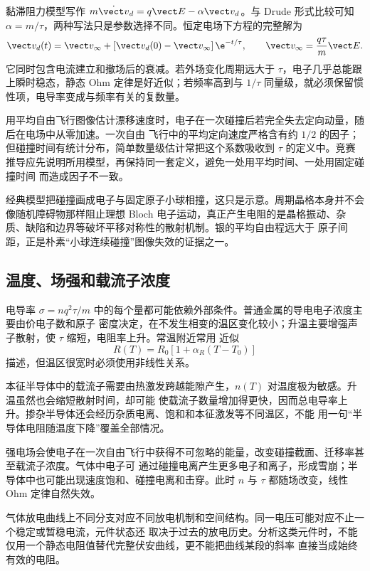 黏滞阻力模型写作 $m\dot{\vect v}_d=q\vect E-\alpha\vect v_d$。与 Drude 形式比较可知
$\alpha=m/\tau$，两种写法只是参数选择不同。恒定电场下方程的完整解为
\begin{equation}
 \vect v_d(t)=\vect v_{\infty}+
 \left[\vect v_d(0)-\vect v_{\infty}\right]\e^{-t/\tau},
 \qquad
 \vect v_{\infty}=\frac{q\tau}{m}\vect E.
\end{equation}
它同时包含电流建立和撤场后的衰减。若外场变化周期远大于 $\tau$，电子几乎总能跟上瞬时稳态，静态 Ohm
定律是好近似；若频率高到与 $1/\tau$ 同量级，就必须保留惯性项，电导率变成与频率有关的复数量。

用平均自由飞行图像估计漂移速度时，电子在一次碰撞后若完全失去定向动量，随后在电场中从零加速。一次自由
飞行中的平均定向速度严格含有约 $1/2$ 的因子；但碰撞时间有统计分布，简单数量级估计常把这个系数吸收到
$\tau$ 的定义中。竞赛推导应先说明所用模型，再保持同一套定义，避免一处用平均时间、一处用固定碰撞时间
而造成因子不一致。

经典模型把碰撞画成电子与固定原子小球相撞，这只是示意。周期晶格本身并不会像随机障碍物那样阻止理想 Bloch
电子运动，真正产生电阻的是晶格振动、杂质、缺陷和边界等破坏平移对称性的散射机制。银的平均自由程远大于
原子间距，正是朴素“小球连续碰撞”图像失效的证据之一。

\subsection*{温度、场强和载流子浓度}

电导率 $\sigma=nq^2\tau/m$ 中的每个量都可能依赖外部条件。普通金属的导电电子浓度主要由价电子数和原子
密度决定，在不发生相变的温区变化较小；升温主要增强声子散射，使 $\tau$ 缩短，电阻率上升。常温附近常用
近似
\begin{equation}
 R(T)=R_0\left[1+\alpha_R(T-T_0)\right]
\end{equation}
描述，但温区很宽时必须使用非线性关系。

本征半导体中的载流子需要由热激发跨越能隙产生，$n(T)$ 对温度极为敏感。升温虽然也会缩短散射时间，却可能
使载流子数量增加得更快，因而总电导率上升。掺杂半导体还会经历杂质电离、饱和和本征激发等不同温区，不能
用一句“半导体电阻随温度下降”覆盖全部情况。

强电场会使电子在一次自由飞行中获得不可忽略的能量，改变碰撞截面、迁移率甚至载流子浓度。气体中电子可
通过碰撞电离产生更多电子和离子，形成雪崩；半导体中也可能出现速度饱和、碰撞电离和击穿。此时 $n$ 与
$\tau$ 都随场改变，线性 Ohm 定律自然失效。

气体放电曲线上不同分支对应不同放电机制和空间结构。同一电压可能对应不止一个稳定或暂稳电流，元件状态还
取决于过去的放电历史。分析这类元件时，不能仅用一个静态电阻值替代完整伏安曲线，更不能把曲线某段的斜率
直接当成始终有效的电阻。

